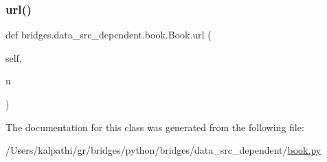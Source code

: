 \mbox{\label{classbridges_1_1data__src__dependent_1_1book_1_1_book_a193b108cb73c94087a907e61481618e2}} 
\subsubsection{\texorpdfstring{url()}{url()}\hspace{0.1cm}{\footnotesize\ttfamily [2/2]}}
{\footnotesize\ttfamily def bridges.\+data\+\_\+src\+\_\+dependent.\+book.\+Book.\+url (\begin{DoxyParamCaption}\item[{}]{self,  }\item[{}]{u }\end{DoxyParamCaption})}



The documentation for this class was generated from the following file\+:\begin{DoxyCompactItemize}
\item 
/\+Users/kalpathi/gr/bridges/python/bridges/data\+\_\+src\+\_\+dependent/\mbox{\hyperlink{book_8py}{book.\+py}}\end{DoxyCompactItemize}
